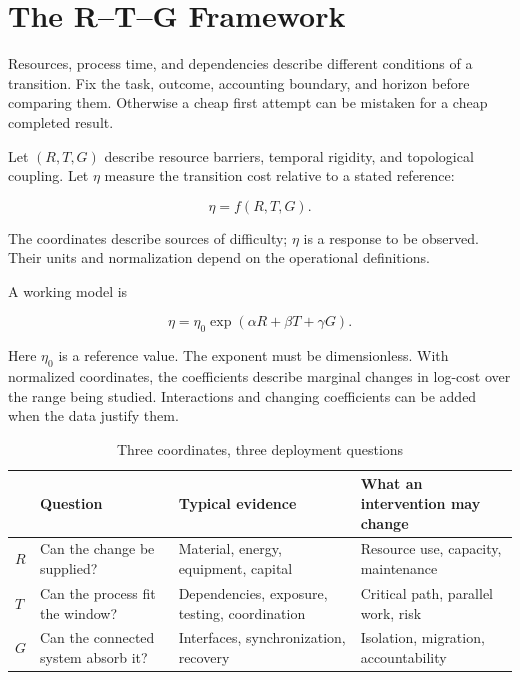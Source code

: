 \section{The R--T--G Framework}

Resources, process time, and dependencies describe different conditions of a transition. Fix the task, outcome, accounting boundary, and horizon before comparing them. Otherwise a cheap first attempt can be mistaken for a cheap completed result.


Let $(R,T,G)$ describe resource barriers, temporal rigidity, and topological coupling. Let $\eta$ measure the transition cost relative to a stated reference:

\begin{equation}
\eta=f(R,T,G).
\label{eq:eta-rtg}
\end{equation}

The coordinates describe sources of difficulty; $\eta$ is a response to be observed. Their units and normalization depend on the operational definitions.

A working model is

\begin{equation}
\eta=\eta_0\exp(\alpha R+\beta T+\gamma G).
\label{eq:eta-exp}
\end{equation}

Here $\eta_0$ is a reference value. The exponent must be dimensionless. With normalized coordinates, the coefficients describe marginal changes in log-cost over the range being studied. Interactions and changing coefficients can be added when the data justify them.

\begin{table}[ht]
\centering
\caption{Three coordinates, three deployment questions}
\label{tab:ch2-rtg}
{\small
\begin{tabularx}{\textwidth}{@{}lYYY@{}}
\toprule
 & Question & Typical evidence & What an intervention may change\\
\midrule
$R$ & Can the change be supplied? & Material, energy, equipment, capital & Resource use, capacity, maintenance\\
$T$ & Can the process fit the window? & Dependencies, exposure, testing, coordination & Critical path, parallel work, risk\\
$G$ & Can the connected system absorb it? & Interfaces, synchronization, recovery & Isolation, migration, accountability\\
\bottomrule
\end{tabularx}}
\end{table}

